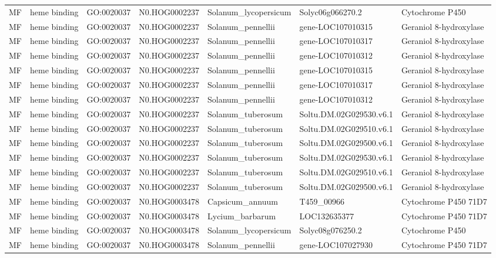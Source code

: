 \begin{table}
\begin{tabular}[t]{lllllll}
MF & heme binding & GO:0020037 & N0.HOG0002237 & Solanum\_lycopersicum & Solyc06g066270.2 & Cytochrome P450\\
MF & heme binding & GO:0020037 & N0.HOG0002237 & Solanum\_pennellii & gene-LOC107010315 & Geraniol 8-hydroxylase\\
MF & heme binding & GO:0020037 & N0.HOG0002237 & Solanum\_pennellii & gene-LOC107010317 & Geraniol 8-hydroxylase\\
MF & heme binding & GO:0020037 & N0.HOG0002237 & Solanum\_pennellii & gene-LOC107010312 & Geraniol 8-hydroxylase\\
MF & heme binding & GO:0020037 & N0.HOG0002237 & Solanum\_pennellii & gene-LOC107010315 & Geraniol 8-hydroxylase\\
MF & heme binding & GO:0020037 & N0.HOG0002237 & Solanum\_pennellii & gene-LOC107010317 & Geraniol 8-hydroxylase\\
MF & heme binding & GO:0020037 & N0.HOG0002237 & Solanum\_pennellii & gene-LOC107010312 & Geraniol 8-hydroxylase\\
MF & heme binding & GO:0020037 & N0.HOG0002237 & Solanum\_tuberosum & Soltu.DM.02G029530.v6.1 & Geraniol 8-hydroxylase\\
MF & heme binding & GO:0020037 & N0.HOG0002237 & Solanum\_tuberosum & Soltu.DM.02G029510.v6.1 & Geraniol 8-hydroxylase\\
MF & heme binding & GO:0020037 & N0.HOG0002237 & Solanum\_tuberosum & Soltu.DM.02G029500.v6.1 & Geraniol 8-hydroxylase\\
MF & heme binding & GO:0020037 & N0.HOG0002237 & Solanum\_tuberosum & Soltu.DM.02G029530.v6.1 & Geraniol 8-hydroxylase\\
MF & heme binding & GO:0020037 & N0.HOG0002237 & Solanum\_tuberosum & Soltu.DM.02G029510.v6.1 & Geraniol 8-hydroxylase\\
MF & heme binding & GO:0020037 & N0.HOG0002237 & Solanum\_tuberosum & Soltu.DM.02G029500.v6.1 & Geraniol 8-hydroxylase\\
MF & heme binding & GO:0020037 & N0.HOG0003478 & Capsicum\_annuum & T459\_00966 & Cytochrome P450 71D7\\
MF & heme binding & GO:0020037 & N0.HOG0003478 & Lycium\_barbarum & LOC132635377 & Cytochrome P450 71D7\\
MF & heme binding & GO:0020037 & N0.HOG0003478 & Solanum\_lycopersicum & Solyc08g076250.2 & Cytochrome P450\\
MF & heme binding & GO:0020037 & N0.HOG0003478 & Solanum\_pennellii & gene-LOC107027930 & Cytochrome P450 71D7\\

\end{tabular}
\end{table}
